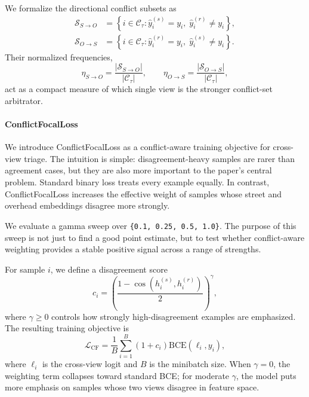 \documentclass[sigconf]{acmart}
\newcommand{\conf}{\mathcal{C}_{\tau}}
\begin{document}
We formalize the directional conflict subsets as
\begin{align}
\mathcal{S}_{S\rightarrow O}
&=\left\{i\in\conf:
\hat{y}_i^{(s)}=y_i,\;
\hat{y}_i^{(r)}\neq y_i\right\},\\
\mathcal{S}_{O\rightarrow S}
&=\left\{i\in\conf:
\hat{y}_i^{(r)}=y_i,\;
\hat{y}_i^{(s)}\neq y_i\right\}.
\end{align}
Their normalized frequencies,
\begin{equation}
\eta_{S\rightarrow O}
=\frac{|\mathcal{S}_{S\rightarrow O}|}{|\conf|},
\qquad
\eta_{O\rightarrow S}
=\frac{|\mathcal{S}_{O\rightarrow S}|}{|\conf|},
\label{eq:dominancefractions}
\end{equation}
act as a compact measure of which single view is the stronger conflict-set
arbitrator.



\paragraph{ConflictFocalLoss}

We introduce ConflictFocalLoss as a conflict-aware training objective for
cross-view triage. The intuition is simple: disagreement-heavy samples are
rarer than agreement cases, but they are also more important to the paper's
central problem. Standard binary loss treats every example equally. In
contrast, ConflictFocalLoss increases the effective weight of samples whose
street and overhead embeddings disagree more strongly.

We evaluate a gamma sweep over \texttt{\{0.1, 0.25, 0.5, 1.0\}}. The purpose of
this sweep is not just to find a good point estimate, but to test whether
conflict-aware weighting provides a stable positive signal across a range of
strengths.

For sample $i$, we define a disagreement score
\begin{equation}
c_i=\left(\frac{1-\cos(h_i^{(s)},h_i^{(r)})}{2}\right)^\gamma,
\label{eq:conflictweight}
\end{equation}
where $\gamma \ge 0$ controls how strongly high-disagreement examples are
emphasized. The resulting training objective is
\begin{equation}
\mathcal{L}_{\mathrm{CF}}
=\frac{1}{B}\sum_{i=1}^{B}
\left(1+c_i\right)
\mathrm{BCE}\left(\ell_i,y_i\right),
\label{eq:cfloss}
\end{equation}
where $\ell_i$ is the cross-view logit and $B$ is the minibatch size. When
$\gamma=0$, the weighting term collapses toward standard BCE; for moderate
$\gamma$, the model puts more emphasis on samples whose two views disagree in
feature space.
\end{document}
